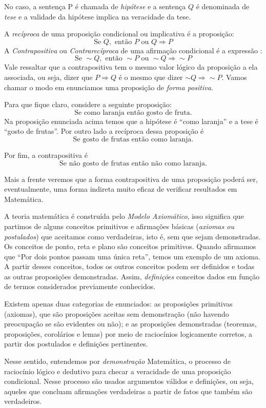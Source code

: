 No caso, a sentença P é chamada de \emph{hipótese} e a sentença $Q$ é
denominada de \emph{tese} e a validade da hipótese implica na veracidade da
tese.

A \emph{recíproca} de uma proposição condicional ou implicativa é a
proposição:
\[
  \text{Se }     Q,
  \text{ então } P
  \text{ ou }    Q \Rightarrow P
\]
A \emph{Contrapositiva} ou \emph{Contrarecíproca}
de uma afirmação condicional é a expressão :
\[
  \text{Se }     \sim Q,
  \text{ então } \sim P
  \text{ ou }    \sim Q
  \Rightarrow    \sim P
\]
Vale ressaltar que a contrapositiva tem o mesmo valor lógico da proposição a
ela associada, ou seja, dizer que $P \Rightarrow Q$ é o mesmo que dizer
$\sim Q \Rightarrow \sim P$.
Vamos chamar o modo em enunciamos uma proposição de
\emph{forma  positiva}.

Para que fique claro, considere a seguinte proposição:
\[
  \text{Se como laranja então gosto de fruta.}
\]
Na proposição enunciada acima temos que a hipótese é ``como laranja''
e a tese é ``gosto de frutas''.
Por outro lado a recíproca dessa proposição é
\[
  \text{Se gosto de frutas então como laranja.}
\]

Por fim, a contrapositiva é
\[
  \text{Se não gosto de frutas então não como laranja.}
\]

Mais a frente veremos que a forma contrapositiva de uma proposição poderá ser,
eventualmente, uma forma indireta muito eficaz de verificar resultados em
Matemática.

A teoria matemática é construída pelo \emph{Modelo Axiomático}, isso
significa que partimos de alguns conceitos primitivos e afirmações básicas
(\emph{axiomas ou postulados}) que aceitamos como verdadeiras, isto é, sem
que sejam demonstradas. Os conceitos de ponto, reta e plano são conceitos
primitivos. Quando afirmamos que ``Por dois pontos passam uma única reta'',
temos um exemplo de um axioma. A partir desses conceitos, todos os outros
conceitos podem ser definidos e todas as outras proposições demonstradas.
Assim, \emph{definições}  conceitos dados em função de termos considerados
previamente conhecidos.

Existem apenas duas categorias de enunciados: as proposições primitivas
(axiomas), que são proposições aceitas sem demonstração (não havendo
preocupação se são evidentes ou não); e as proposições demonstradas (teoremas,
proposições, corolários e lemas) por meio de raciocínios logicamente corretos,
a partir dos postulados e definições pertinentes.

Nesse sentido, entendemos por \emph{demonstração} Matemática, o processo de
raciocínio lógico e dedutivo para checar a veracidade de uma proposição
condicional. Nesse processo são usados argumentos válidos e definições, ou
seja, aqueles que concluam afirmações verdadeiras a partir de fatos que também
são verdadeiros.

